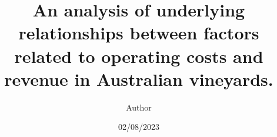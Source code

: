 \documentclass[review,12pt,authoryear]{elsarticle}
\begin{document}
\begin{linenumbers}
\begin{frontmatter}




\title{An analysis of underlying relationships between factors related to operating costs and revenue in Australian vineyards.}




\author[label1,label2,label3]{Author}
\date{02/08/2023}

\begin{abstract}


\end{abstract}
\end{frontmatter}
\end{linenumbers}
\end{document}
